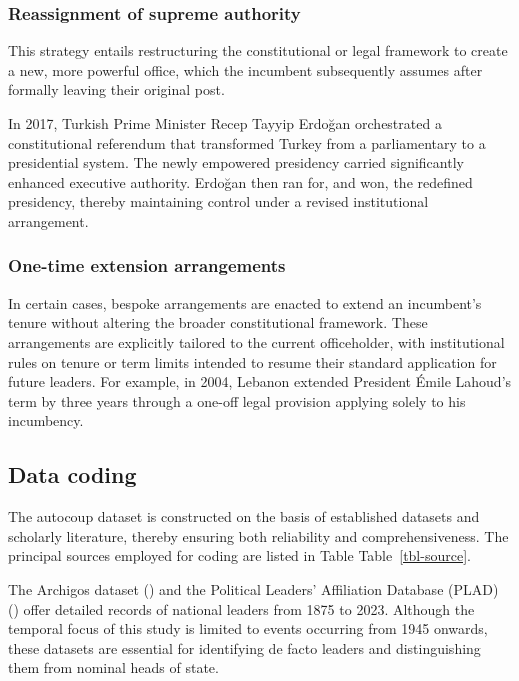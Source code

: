 \documentclass[
  12pt,
]{report}
\begin{document}
\subsubsection*{Reassignment of supreme
authority}\label{reassignment-of-supreme-authority}

This strategy entails restructuring the constitutional or legal
framework to create a new, more powerful office, which the incumbent
subsequently assumes after formally leaving their original post.

In 2017, Turkish Prime Minister Recep Tayyip Erdoğan orchestrated a
constitutional referendum that transformed Turkey from a parliamentary
to a presidential system. The newly empowered presidency carried
significantly enhanced executive authority. Erdoğan then ran for, and
won, the redefined presidency, thereby maintaining control under a
revised institutional arrangement.

\subsubsection*{One-time extension
arrangements}\label{one-time-extension-arrangements}

In certain cases, bespoke arrangements are enacted to extend an
incumbent's tenure without altering the broader constitutional
framework. These arrangements are explicitly tailored to the current
officeholder, with institutional rules on tenure or term limits intended
to resume their standard application for future leaders. For example, in
2004, Lebanon extended President Émile Lahoud's term by three years
through a one-off legal provision applying solely to his incumbency.

\subsection*{Data coding}\label{data-coding}

The autocoup dataset is constructed on the basis of established datasets
and scholarly literature, thereby ensuring both reliability and
comprehensiveness. The principal sources employed for coding are listed
in Table Table~\ref{tbl-source}.

The Archigos dataset () and the Political Leaders' Affiliation Database (PLAD)
() offer
detailed records of national leaders from 1875 to 2023. Although the
temporal focus of this study is limited to events occurring from 1945
onwards, these datasets are essential for identifying de facto leaders
and distinguishing them from nominal heads of state.
\end{document}
